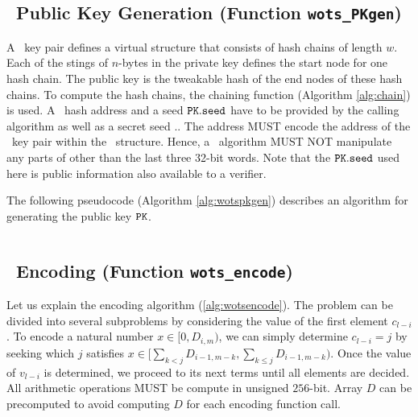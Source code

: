 \subsection{\WOTSCS\ Public Key Generation (Function \texttt{wots\_PKgen})}

A \WOTSCS\ key pair defines a virtual structure that consists of \len hash chains of length $w.$ Each of the \len stings of $n$-bytes in the private key defines the start node for one hash chain. The public key is the tweakable hash of the end nodes of these hash chains. To compute the hash chains, the chaining function (Algorithm \ref{alg:chain}) is used. A \WOTSCS\ hash address \ADRS and a seed $\pk.\seed$ have to be provided by the calling algorithm as well as a secret seed \sk.\seed. The address \ADRS MUST encode the address of the \WOTSCS\ key pair within the \SPHINCSA\ structure. Hence, a \WOTSCS\ algorithm MUST NOT manipulate any parts of \ADRS other than the last three 32-bit words. Note that the $\pk.\seed$ used here is public information also available to a verifier. 

The following pseudocode (Algorithm \ref{alg:wotspkgen}) describes an algorithm for generating the public key $\pk$.

\begin{algorithm}
\inputminted[breaklines,linenos,tabsize=2,mathescape,escapeinside=||]{C}{paper/code/wots_PKgen.cs}
\caption{\texttt{wots\_PKgen} --- Generating a \WOTSCS\ public key.}
\label{alg:wotspkgen}
\end{algorithm}


\subsection{\WOTSCS\ Encoding (Function \texttt{wots\_encode})}

Let us explain the encoding algorithm (\cref{alg:wotsencode}). The problem can be divided into several subproblems by considering the value of the first element $c_{l-i}$. To encode a natural number $x\in [0,D_{i,m})$, we can simply determine $c_{l-i}=j$ by seeking which $j$ satisfies $x\in [\sum_{k<j}D_{i-1,m-k},\sum_{k\leq j}D_{i-1,m-k})$. Once the value of $v_{l-i}$ is determined, we proceed to its next terms until all elements are decided. All arithmetic operations MUST be compute in unsigned $256$-bit. Array $D$ can be precomputed to avoid computing $D$ for each encoding function call. 

\begin{algorithm}
\inputminted[breaklines,linenos,tabsize=2,mathescape,escapeinside=||]{C}{paper/code/wots_encode.cs}
\caption{\texttt{wots\_encode} --- Encoding message to constant-sum encoding.}
\label{alg:wotsencode}
\end{algorithm}

